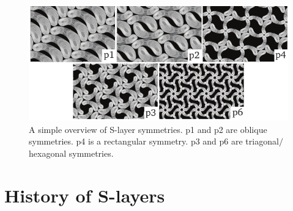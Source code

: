         \begin{figure}[htb] %
                \begin{center}
                    \includegraphics[]{intro/img/symmetries.pdf}
                \end{center}
                \caption[A simple overview of \ac{S-layer} symmetries]{A simple overview of \ac{S-layer} symmetries. p1 and p2 are oblique symmetries. 
                p4 is a rectangular symmetry.  
                p3 and p6 are triagonal$/$hexagonal symmetries. 
                 }
                \label{fig:symmetries}
        \end{figure}



    \section{History of S-layers} %
    \label{sec:history_of_s_layers}
       




